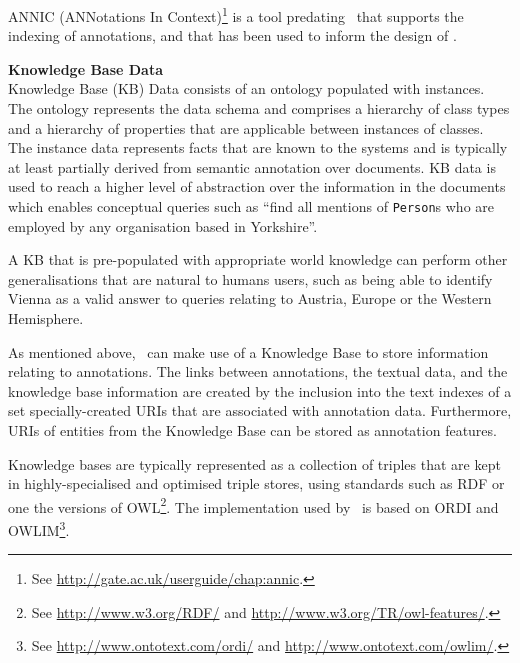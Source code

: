 ANNIC (ANNotations In
Context)\footnote{See \url{http://gate.ac.uk/userguide/chap:annic}.} is a tool
predating \Mimir\ that supports the indexing of annotations, and that has been
used to inform the design of \Mimir.

{\bf Knowledge Base Data}\\
Knowledge Base (KB) Data  consists of an ontology populated with instances. The
ontology represents the data schema and comprises a hierarchy of class types
and a hierarchy of properties that are applicable between instances of classes.
The instance data represents facts that are known to the systems and is
typically at least partially derived from semantic annotation over documents.
KB data is used to reach a higher level of abstraction over the information in
the documents which enables conceptual queries such as ``find all mentions of
{\tt Person}s who are employed by any organisation based in Yorkshire''.

A KB that is pre-populated with appropriate world knowledge can perform other
generalisations that are natural to humans users, such as being able to identify
Vienna as a valid answer to queries relating to Austria, Europe or the Western
Hemisphere.

As mentioned above, \Mimir\ can make use of a Knowledge Base to store
information relating to annotations. The links between annotations, the textual
data, and the knowledge base information are created by the inclusion into the
text indexes of a set specially-created URIs that are associated with
annotation data. Furthermore, URIs of entities from the Knowledge Base can be
stored as annotation features.

Knowledge bases are typically represented as a collection of triples that are
kept in highly-specialised and optimised triple stores, using standards such as
RDF or one the versions of OWL\footnote{See
\url{http://www.w3.org/RDF/} and \url{http://www.w3.org/TR/owl-features/}.}. The
implementation used by \Mimir\ is based on ORDI and
OWLIM\footnote{See
\url{http://www.ontotext.com/ordi/} and \url{http://www.ontotext.com/owlim/}.}.

